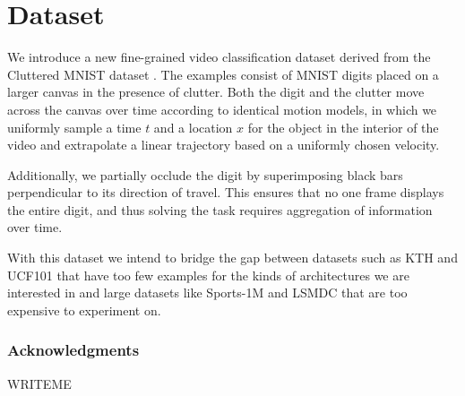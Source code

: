 \documentclass{article} %
\begin{document}
\section{Dataset}

We introduce a new fine-grained video classification dataset derived from the Cluttered MNIST dataset \cite{clutteredmnist}.
The examples consist of MNIST digits placed on a larger canvas in the presence of clutter.
Both the digit and the clutter move across the canvas over time according to identical motion models, in which we uniformly sample a time $t$ and a location $x$ for the object in the interior of the video and extrapolate a linear trajectory based on a uniformly chosen velocity.

Additionally, we partially occlude the digit by superimposing black bars perpendicular to its direction of travel.
This ensures that no one frame displays the entire digit, and thus solving the task requires aggregation of information over time.

With this dataset we intend to bridge the gap between datasets such as KTH \cite{kth} and UCF101 \cite{ucf101} that have too few examples for the kinds of architectures we are interested in and large datasets like Sports-1M \cite{sports1m} and LSMDC \cite{lsmdc} that are too expensive to experiment on.

\subsubsection*{Acknowledgments}

WRITEME



\end{document}
